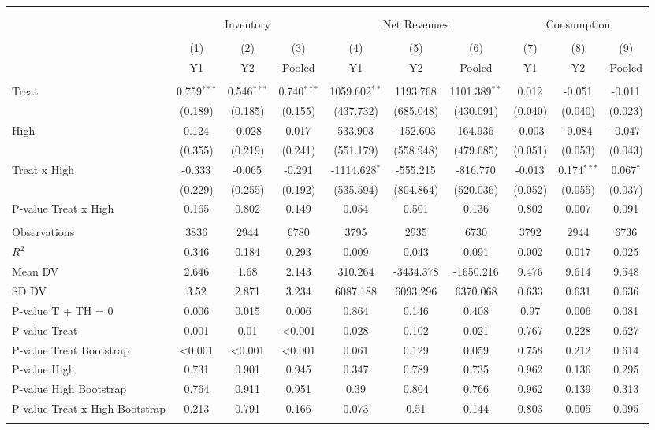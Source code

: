 
\begin{tabular}{@{\extracolsep{5pt}}lccccccccc}
\\[-1.8ex]\hline
\hline \\[-1.8ex]
\\[-1.8ex] & \multicolumn{3}{c}{Inventory} & \multicolumn{3}{c}{Net Revenues} & \multicolumn{3}{c}{Consumption}  \\
\\[-1.8ex] & (1) & (2) & (3) & (4) & (5) & (6) & (7) & (8) & (9) 
 \\ & Y1 & Y2 & Pooled & Y1 & Y2 & Pooled & Y1 & Y2 & Pooled \\
\hline \\[-1.8ex]
 Treat & 0.759$^{***}$ & 0.546$^{***}$ & 0.740$^{***}$ & 1059.602$^{**}$ & 1193.768$^{}$ & 1101.389$^{**}$ & 0.012$^{}$ & -0.051$^{}$ & -0.011$^{}$ \\
& (0.189) & (0.185) & (0.155) & (437.732) & (685.048) & (430.091) & (0.040) & (0.040) & (0.023) \\
 High & 0.124$^{}$ & -0.028$^{}$ & 0.017$^{}$ & 533.903$^{}$ & -152.603$^{}$ & 164.936$^{}$ & -0.003$^{}$ & -0.084$^{}$ & -0.047$^{}$ \\
& (0.355) & (0.219) & (0.241) & (551.179) & (558.948) & (479.685) & (0.051) & (0.053) & (0.043) \\
 Treat x High & -0.333$^{}$ & -0.065$^{}$ & -0.291$^{}$ & -1114.628$^{*}$ & -555.215$^{}$ & -816.770$^{}$ & -0.013$^{}$ & 0.174$^{***}$ & 0.067$^{*}$ \\
& (0.229) & (0.255) & (0.192) & (535.594) & (804.864) & (520.036) & (0.052) & (0.055) & (0.037) \\
 P-value Treat x High & 0.165 & 0.802 & 0.149 & 0.054 & 0.501 & 0.136 & 0.802 & 0.007 & 0.091 \\
\hline \\[-1.8ex]
 Observations & 3836 & 2944 & 6780 & 3795 & 2935 & 6730 & 3792 & 2944 & 6736 \\
 $R^2$ & 0.346 & 0.184 & 0.293 & 0.009 & 0.043 & 0.091 & 0.002 & 0.017 & 0.025 \\
 Mean DV & 2.646 & 1.68 & 2.143 & 310.264 & -3434.378 & -1650.216 & 9.476 & 9.614 & 9.548 \\
 SD DV & 3.52 & 2.871 & 3.234 & 6087.188 & 6093.296 & 6370.068 & 0.633 & 0.631 & 0.636 \\
 P-value T + TH = 0 & 0.006 & 0.015 & 0.006 & 0.864 & 0.146 & 0.408 & 0.97 & 0.006 & 0.081 \\
 P-value Treat & 0.001 & 0.01 & <0.001 & 0.028 & 0.102 & 0.021 & 0.767 & 0.228 & 0.627 \\
 P-value Treat Bootstrap & <0.001 & <0.001 & <0.001 & 0.061 & 0.129 & 0.059 & 0.758 & 0.212 & 0.614 \\
 P-value High & 0.731 & 0.901 & 0.945 & 0.347 & 0.789 & 0.735 & 0.962 & 0.136 & 0.295 \\
 P-value High Bootstrap & 0.764 & 0.911 & 0.951 & 0.39 & 0.804 & 0.766 & 0.962 & 0.139 & 0.313 \\
 P-value Treat x High Bootstrap & 0.213 & 0.791 & 0.166 & 0.073 & 0.51 & 0.144 & 0.803 & 0.005 & 0.095 \\
\hline
\hline \\[-1.8ex]
\end{tabular}

